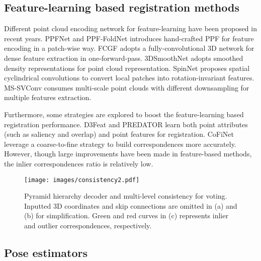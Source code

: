 \documentclass[10pt,twocolumn,letterpaper]{article}
\begin{document}
\subsection{Feature-learning based registration methods}

Different point cloud encoding network for feature-learning have been proposed in recent years. 
PPFNet\cite{deng2018ppfnet} and PPF-FoldNet\cite{deng2018ppf}
introduces hand-crafted PPF\cite{drost2010model} for feature encoding in a patch-wise way. FCGF\cite{choy2019fully} adopts a fully-convolutional 3D network for dense feature extraction in one-forward-pass. 3DSmoothNet\cite{gojcic2019perfect} adopts smoothed density representations for point cloud representation. SpinNet\cite{ao2021spinnet} proposes spatial cyclindrical convolutions to convert local patches into rotation-invariant features. MS-SVConv\cite{horache20213d} consumes multi-scale point clouds with different downsampling for multiple features extraction.

Furthermore, some strategies are explored to boost the feature-learning based registration performance. D3Feat\cite{bai2020d3feat} and  PREDATOR\cite{huang2021predator} learn both point attributes (such as saliency and overlap) and point features for registration. CoFiNet\cite{yu2021cofinet} leverage a coarse-to-fine strategy to build correspondences more accurately. However, though large improvements have been made in feature-based methods, the inlier correspondences ratio is relatively low. 

\begin{figure*}[!t]
\centering
\vspace{-.5em}
\texttt{[image: images/consistency2.pdf]}
\vspace{-.75em}
\caption{Pyramid hierarchy decoder and multi-level consistency for voting. Inputted 3D coordinates and skip connections are omitted in (a) and (b) for simplification. Green and red curves in (c) represents inlier and outlier correspondences, respectively.}
\vspace{-1.5em}
\label{fig:consistency}
\end{figure*}

\vspace{-.25em}
\subsection{Pose estimators}
\end{document}

